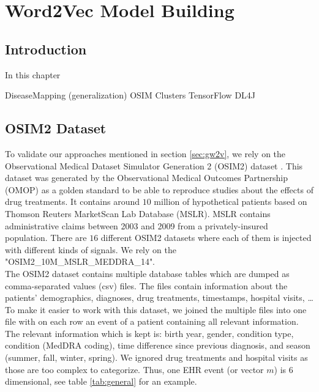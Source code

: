 \graphicspath{ {Implementation/Images/} }


\chapter{Word2Vec Model Building}
\label{cha:implementation}

\section{Introduction}
In this chapter 

DiseaseMapping (generalization)
OSIM
Clusters
TensorFlow
DL4J

\section{OSIM2 Dataset}
\label{sec:osim2DS}

To validate our approaches mentioned in section \ref{sec:gw2v}, we rely on the Observational Medical Dataset Simulator Generation 2 (OSIM2) dataset \cite{OSIM:online}. This dataset was generated by the Observational Medical Outcomes Partnership (OMOP) as a golden standard to be able to reproduce studies about the effects of drug treatments. It contains around $10$ million of hypothetical patients based on Thomson Reuters MarketScan Lab Database (MSLR). MSLR contains administrative claims between 2003 and 2009 from a privately-insured population. There are $16$ different OSIM2 datasets where each of them is injected with different kinds of signals. We rely on the "OSIM2\_10M\_MSLR\_MEDDRA\_14". \\

The OSIM2 dataset contains multiple database tables which are dumped as comma-separated values (csv) files. The files contain information about the patients' demographics, diagnoses, drug treatments, timestamps, hospital visits, \ldots \\
To make it easier to work with this dataset, we joined the multiple files into one file with on each row an event of a patient containing all relevant information. The relevant information which is kept is: birth year, gender, condition type, condition (MedDRA coding), time difference since previous diagnosis, and season (summer, fall, winter, spring). We ignored drug treatments and hospital visits as those are too complex to categorize. Thus, one EHR event (or vector $m$) is $6$ dimensional, see table \ref{tab:general} for an example. \\	

